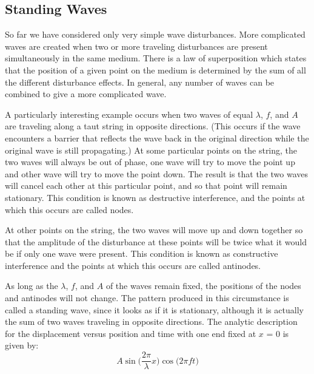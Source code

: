 \subsection{Standing Waves}

So far we have considered only very simple wave disturbances. More complicated waves are created when two or more traveling disturbances are present simultaneously in the same medium. There is a law of superposition which states that the position of a given point on the medium is determined by the sum of all the different disturbance effects. In general, any number of waves can be combined to give a more complicated wave.\myskip

A particularly interesting example occurs when two waves of equal $\lambda$, $f$, and $A$ are traveling along a taut string in opposite directions. (This occurs if the wave encounters a barrier that reflects the wave back in the original direction while the original wave is still propagating.) At some particular points on the string, the two waves will always be out of phase, one wave will try to move the point up and other wave will try to move the point down. The result is that the two waves will cancel each other at this particular point, and so that point will remain stationary. This condition is known as destructive interference, and the points at which this occurs are called nodes. \myskip

At other points on the string, the two waves will move up and down together so that the amplitude of the disturbance at these points will be twice what it would be if only one wave were present. This condition is known as constructive interference and the points at which this occurs are called antinodes. \myskip

As long as the $\lambda$, $f$, and $A$ of the waves remain fixed, the positions of the nodes and antinodes will not change. The pattern produced in this circumstance is called a standing wave, since it looks as if it is stationary, although it is actually the sum of two waves traveling in opposite directions. The analytic description for the displacement versus position and time with one end fixed at $x$ = 0 is given by: 
\begin{equation}
  A\sin\bigg(\frac{2\pi}{\lambda}x\bigg)\cos\bigg(2\pi f t\bigg)
\end{equation}

